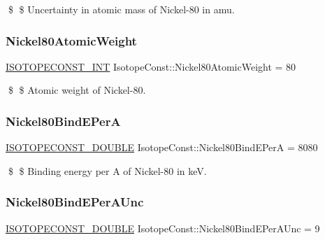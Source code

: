 \$ \$ Uncertainty in atomic mass of Nickel-\/80 in amu. \mbox{\label{group___isotope_const-_nickel-_ni80_gac713735c61d7e7c1aedee250853fd266}} 
\subsubsection{\texorpdfstring{Nickel80\+Atomic\+Weight}{Nickel80AtomicWeight}}
{\footnotesize\ttfamily \mbox{\hyperlink{group___isotope_const-_macros_ga5f18360b3e99483a35c32d789e62621c}{I\+S\+O\+T\+O\+P\+E\+C\+O\+N\+S\+T\+\_\+\+I\+NT}} Isotope\+Const\+::\+Nickel80\+Atomic\+Weight = 80}

\$ \$ Atomic weight of Nickel-\/80. \mbox{\label{group___isotope_const-_nickel-_ni80_gabc1ce44f1f77f87c74a6e03b3d33db38}} 
\subsubsection{\texorpdfstring{Nickel80\+Bind\+E\+PerA}{Nickel80BindEPerA}}
{\footnotesize\ttfamily \mbox{\hyperlink{group___isotope_const-_macros_ga8f45a7272ce02c0b4c65c44636ed719a}{I\+S\+O\+T\+O\+P\+E\+C\+O\+N\+S\+T\+\_\+\+D\+O\+U\+B\+LE}} Isotope\+Const\+::\+Nickel80\+Bind\+E\+PerA = 8080}

\$ \$ Binding energy per A of Nickel-\/80 in keV. \mbox{\label{group___isotope_const-_nickel-_ni80_ga874f3e86ee490937501f45aa070da770}} 
\subsubsection{\texorpdfstring{Nickel80\+Bind\+E\+Per\+A\+Unc}{Nickel80BindEPerAUnc}}
{\footnotesize\ttfamily \mbox{\hyperlink{group___isotope_const-_macros_ga8f45a7272ce02c0b4c65c44636ed719a}{I\+S\+O\+T\+O\+P\+E\+C\+O\+N\+S\+T\+\_\+\+D\+O\+U\+B\+LE}} Isotope\+Const\+::\+Nickel80\+Bind\+E\+Per\+A\+Unc = 9}

